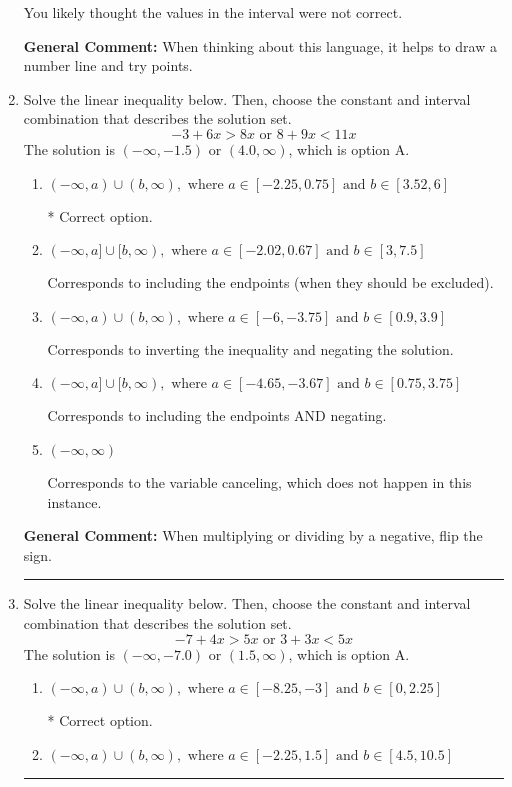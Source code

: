 \documentclass{extbook}[14pt]
\newcommand{\litem}[1]{\item #1

\rule{\textwidth}{0.4pt}}
\begin{document}
\begin{enumerate}
{\begin{enumerate}[label=\Alph*.]
You likely thought the values in the interval were not correct.
\end{enumerate}

\textbf{General Comment:} When thinking about this language, it helps to draw a number line and try points.
}
\litem{
Solve the linear inequality below. Then, choose the constant and interval combination that describes the solution set.
\[ -3 + 6 x > 8 x \text{ or } 8 + 9 x < 11 x \]The solution is \( (-\infty, -1.5) \text{ or } (4.0, \infty) \), which is option A.\begin{enumerate}[label=\Alph*.]
\item \( (-\infty, a) \cup (b, \infty), \text{ where } a \in [-2.25, 0.75] \text{ and } b \in [3.52, 6] \)

 * Correct option.
\item \( (-\infty, a] \cup [b, \infty), \text{ where } a \in [-2.02, 0.67] \text{ and } b \in [3, 7.5] \)

Corresponds to including the endpoints (when they should be excluded).
\item \( (-\infty, a) \cup (b, \infty), \text{ where } a \in [-6, -3.75] \text{ and } b \in [0.9, 3.9] \)

Corresponds to inverting the inequality and negating the solution.
\item \( (-\infty, a] \cup [b, \infty), \text{ where } a \in [-4.65, -3.67] \text{ and } b \in [0.75, 3.75] \)

Corresponds to including the endpoints AND negating.
\item \( (-\infty, \infty) \)

Corresponds to the variable canceling, which does not happen in this instance.
\end{enumerate}

\textbf{General Comment:} When multiplying or dividing by a negative, flip the sign.
}
\litem{
Solve the linear inequality below. Then, choose the constant and interval combination that describes the solution set.
\[ -7 + 4 x > 5 x \text{ or } 3 + 3 x < 5 x \]The solution is \( (-\infty, -7.0) \text{ or } (1.5, \infty) \), which is option A.\begin{enumerate}[label=\Alph*.]
\item \( (-\infty, a) \cup (b, \infty), \text{ where } a \in [-8.25, -3] \text{ and } b \in [0, 2.25] \)

 * Correct option.
\item \( (-\infty, a) \cup (b, \infty), \text{ where } a \in [-2.25, 1.5] \text{ and } b \in [4.5, 10.5] \)


\end{enumerate}}
\end{enumerate}
\end{document}
